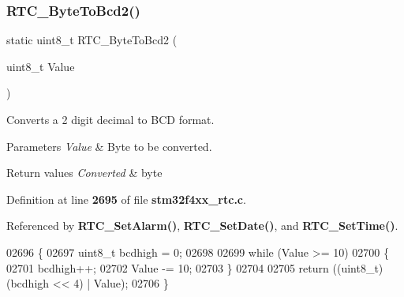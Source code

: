 \subsubsection{R\+T\+C\+\_\+\+Byte\+To\+Bcd2()}
{\footnotesize\ttfamily static uint8\+\_\+t R\+T\+C\+\_\+\+Byte\+To\+Bcd2 (\begin{DoxyParamCaption}\item[{uint8\+\_\+t}]{Value }\end{DoxyParamCaption})\hspace{0.3cm}{\ttfamily [static]}}



Converts a 2 digit decimal to B\+CD format. 


\begin{DoxyParams}{Parameters}
{\em Value} & Byte to be converted. \\
\hline
\end{DoxyParams}

\begin{DoxyRetVals}{Return values}
{\em Converted} & byte \\
\hline
\end{DoxyRetVals}


Definition at line \textbf{ 2695} of file \textbf{ stm32f4xx\+\_\+rtc.\+c}.



Referenced by \textbf{ R\+T\+C\+\_\+\+Set\+Alarm()}, \textbf{ R\+T\+C\+\_\+\+Set\+Date()}, and \textbf{ R\+T\+C\+\_\+\+Set\+Time()}.


\begin{DoxyCode}
02696 \{
02697   uint8\_t bcdhigh = 0;
02698   
02699   \textcolor{keywordflow}{while} (Value >= 10)
02700   \{
02701     bcdhigh++;
02702     Value -= 10;
02703   \}
02704   
02705   \textcolor{keywordflow}{return}  ((uint8\_t)(bcdhigh << 4) | Value);
02706 \}
\end{DoxyCode}
